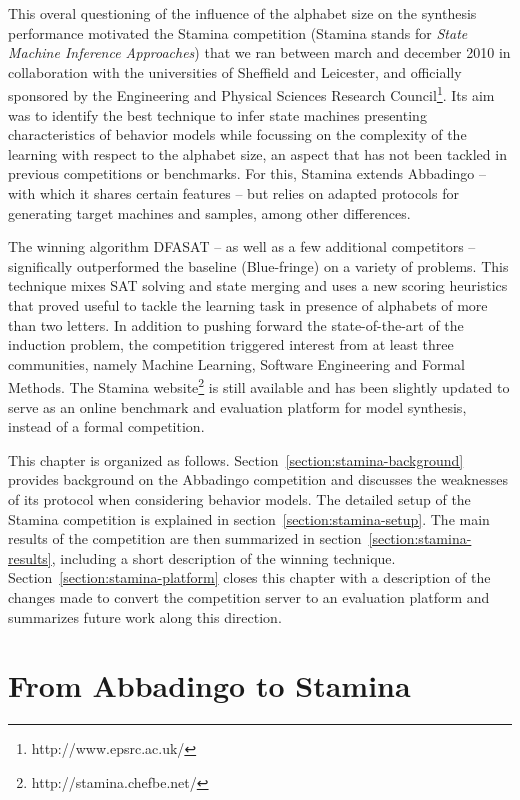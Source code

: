 This overal questioning of the influence of the alphabet size on the synthesis performance motivated the Stamina competition (Stamina stands for \emph{State Machine Inference Approaches}) that we ran between march and december 2010 in collaboration with the universities of Sheffield and Leicester, and officially sponsored by the Engineering and Physical Sciences Research Council\footnote{http://www.epsrc.ac.uk/}. Its aim was to identify the best technique to infer state machines presenting characteristics of behavior models while focussing on the complexity of the learning with respect to the alphabet size, an aspect that has not been tackled in previous competitions or benchmarks. For this, Stamina extends Abbadingo -- with which it shares certain features -- but relies on adapted protocols for generating target machines and samples, among other differences. 

The winning algorithm DFASAT -- as well as a few additional competitors -- significally outperformed the baseline (Blue-fringe) on a variety of problems. This technique mixes SAT solving and state merging and uses a new scoring heuristics that proved useful to tackle the learning task in presence of alphabets of more than two letters. In addition to pushing forward the state-of-the-art of the induction problem, the competition triggered interest from at least three communities, namely Machine Learning, Software Engineering and Formal Methods. The Stamina website\footnote{http://stamina.chefbe.net/} is still available and has been slightly updated to serve as an online benchmark and evaluation platform for model synthesis, instead of a formal competition.

This chapter is organized as follows. Section~\ref{section:stamina-background} provides background on the Abbadingo competition and discusses the weaknesses of its protocol when considering behavior models. The detailed setup of the Stamina competition is explained in section~\ref{section:stamina-setup}. The main results of the competition are then summarized in section~\ref{section:stamina-results}, including a short description of the winning technique. Section~\ref{section:stamina-platform} closes this chapter with a description of the changes made to convert the competition server to an evaluation platform and summarizes future work along this direction.

\section{From Abbadingo to Stamina\label{section:stamina-background}}

